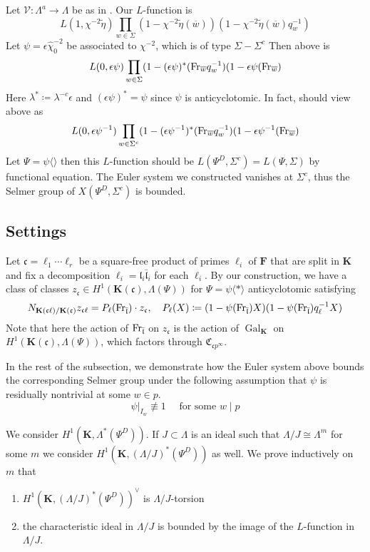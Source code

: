 \documentclass[leqno]{amsart}
\theoremstyle{definition}
\theoremstyle{remark}
\DeclareMathOperator{\Gal}{Gal}
\newcommand{\Fr}{\textnormal{Fr}} %
\newcommand{\fc}{\mathfrak{c}}
\newcommand{\fl}{\mathfrak{l}}
\newcommand{\F}{{\mathbf{F}}} %
\newcommand{\K}{{\mathbf{K}}} %
\newcommand{\bw}{\overline{w}}
\newcommand{\flw}{\bar{\fl}}
\newcommand{\rp}[1]{\mathfrak{C}_{#1}} %
\newcommand{\rk}[1]{\K({#1})} %
\begin{document}
Let $\mathscr{V}\colon \Lambda^a\to \Lambda$
be as in \cite{HT94}.
Our $L$-function is
\[
L(1,\chi^{-2}\tilde{\eta})\prod_{w\in\Sigma}
(1-\chi^{-2}\tilde{\eta}(\bw))
(1-\chi^{-2}\tilde{\eta}(\bw)q_w^{-1})
\]
Let $\psi=\epsilon\hat{\chi}_0^{-2}$ be associated to 
$\chi^{-2}$, which is of type $\Sigma-\Sigma^c$
Then above is 
\[
	L(0,\epsilon\psi)\prod_{w\in \Sigma}
	(1-(\epsilon\psi)^*(\Fr_{\bw}q_w^{-1})
	(1-\epsilon\psi(\Fr_{\bw})
\]
Here  $\lambda^*\coloneqq \lambda^{-c}\epsilon$ 
and $(\epsilon\psi)^*=\psi$ since  $\psi$
is anticyclotomic.
In fact, should view above as
\[
	L(0,\epsilon\psi^{-1})\prod_{w\in\Sigma^c}
	(1-(\epsilon\psi^{-1})^*(\Fr_{\bw}q_w^{-1})
	(1-\epsilon\psi^{-1}(\Fr_{\bw})
\]
Let $\Psi=\psi\langle\rangle$
then this  $L$-function
should be $L(\Psi^D,\Sigma^c)=L(\Psi,\Sigma)$
by functional equation.
The Euler system we constructed vanishes at  $\Sigma^c$,
thus the Selmer group of  $X(\Psi^D,\Sigma^c)$
is bounded. 


\cite{Och05}
\cite{Och08}
\cite{Hsieh2010}
\cite{HT93}
\cite{Hida06}
\cite{Hida06b}
\cite{Rubin}

\subsection{Settings}

Let $\fc=\ell_1\cdots\ell_r$
be a square-free product
of primes $\ell_i$ of  $\F$
that are split in  $\K$
and fix a decomposition
$\ell_i=\fl_i\flw_i$
for each  $\ell_i$.
By our construction, we have 
a class of classes
$z_\fc\in H^1(\rk{\fc},\Lambda(\Psi))$
for  $\Psi=\psi\langle*\rangle$ anticyclotomic 
satisfying 
\[
	N_{\rk{\fc\ell}/\rk{\fc}}z_{\fc\ell}=
	P_\ell(\Fr_{\bar{\fl}})\cdot z_\fc,\quad
	P_\ell(X)\coloneqq(1-\psi(\Fr_{\flw})X)
	(1-\psi(\Fr_{\flw})q_\ell^{-1}X)
\]
Note that here the action of $\Fr_{\flw}$
on $z_{\fc}$ is the action of $\Gal_\K$
on  $H^1(\rk{\fc},\Lambda(\Psi))$,
which factors through  $\rp{\fc p^\infty}$.

In the rest of the subsection,
we demonstrate how the Euler system above
bounds the corresponding Selmer group 
under the following assumption
that $\psi$ is residually nontrivial
at some $w\in p$.
\begin{equation}\label{cond:distinct}\tag{dist}
	\psi\vert_{I_w}\not\equiv1\quad
	\text{ for some } w\mid p
\end{equation}

We consider $H^1(\K, \Lambda^*(\Psi^D))$. 
If  $J\subset \Lambda$ is an ideal 
such that  $\Lambda/J\cong \Lambda^{m}$ for some $m$
we consider  $H^1(\K,(\Lambda/J)^*(\Psi^D))$ as well.
We prove inductively on  $m$ that 
\begin{enumerate}[label=(\alph*)]
	\item $H^1(\K,(\Lambda/J)^*(\Psi^D))^\vee$ is $\Lambda/J$-torsion
	\item the characteristic ideal in $\Lambda/J$
		is bounded by the image of the $L$-function in $\Lambda/J$.
\end{enumerate}
\end{document}
